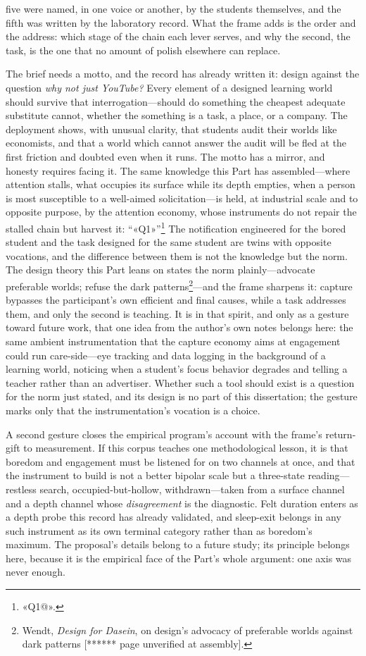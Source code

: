 five were named, in one voice or another, by the students themselves, and the fifth was written by the laboratory record. What the frame adds is the order and the address: which stage of the chain each lever serves, and why the second, the task, is the one that no amount of polish elsewhere can replace.

The brief needs a motto, and the record has already written it: design against the question \textit{why not just YouTube?} Every element of a designed learning world should survive that interrogation---should do something the cheapest adequate substitute cannot, whether the something is a task, a place, or a company. The deployment shows, with unusual clarity, that students audit their worlds like economists, and that a world which cannot answer the audit will be fled at the first friction and doubted even when it runs. The motto has a mirror, and honesty requires facing it. The same knowledge this Part has assembled---where attention stalls, what occupies its surface while its depth empties, when a person is most susceptible to a well-aimed solicitation---is held, at industrial scale and to opposite purpose, by the attention economy, whose instruments do not repair the stalled chain but harvest it: ``«Q1»''\footnote{«Q1@».} The notification engineered for the bored student and the task designed for the same student are twins with opposite vocations, and the difference between them is not the knowledge but the norm. The design theory this Part leans on states the norm plainly---advocate preferable worlds; refuse the dark patterns\footnote{Wendt, \textit{Design for Dasein}, on design's advocacy of preferable worlds against dark patterns [****** page unverified at assembly].}---and the frame sharpens it: capture bypasses the participant's own efficient and final causes, while a task addresses them, and only the second is teaching. It is in that spirit, and only as a gesture toward future work, that one idea from the author's own notes belongs here: the same ambient instrumentation that the capture economy aims at engagement could run care-side---eye tracking and data logging in the background of a learning world, noticing when a student's focus behavior degrades and telling a teacher rather than an advertiser. Whether such a tool should exist is a question for the norm just stated, and its design is no part of this dissertation; the gesture marks only that the instrumentation's vocation is a choice.

A second gesture closes the empirical program's account with the frame's return-gift to measurement. If this corpus teaches one methodological lesson, it is that boredom and engagement must be listened for on two channels at once, and that the instrument to build is not a better bipolar scale but a three-state reading---restless search, occupied-but-hollow, withdrawn---taken from a surface channel and a depth channel whose \textit{disagreement} is the diagnostic. Felt duration enters as a depth probe this record has already validated, and sleep-exit belongs in any such instrument as its own terminal category rather than as boredom's maximum. The proposal's details belong to a future study; its principle belongs here, because it is the empirical face of the Part's whole argument: one axis was never enough.

